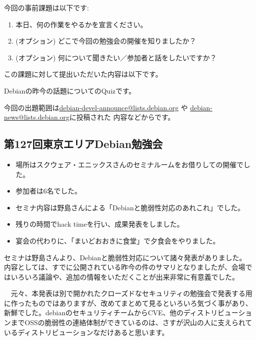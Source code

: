 \documentclass[mingoth,a4paper]{jsarticle}
\begin{document}

今回の事前課題は以下です:
\begin{enumerate}
\item 本日、何の作業をやるかを宣言ください。
\item (オプション) どこで今回の勉強会の開催を知りましたか？
\item (オプション) 何について聞きたい／参加者と話をしたいですか？
\end{enumerate}
この課題に対して提出いただいた内容は以下です。
\begin{multicols}{2}
{\small

}
\end{multicols}


 Debianの昨今の話題についてのQuizです。

今回の出題範囲は\url{debian-devel-announce@lists.debian.org} や \url{debian-news@lists.debian.org}に投稿された
内容などからです。

\begin{multicols}{2}

\end{multicols}


\subsection{第127回東京エリアDebian勉強会}

\begin{itemize}
\item 場所はスクウェア・エニックスさんのセミナルームをお借りしての開催でした。
\item 参加者は6名でした。
\item セミナ内容は野島さんによる「Debianと脆弱性対応のあれこれ」でした。
\item 残りの時間でhack timeを行い、成果発表をしました。
\item 宴会の代わりに、「まいどおおきに食堂」で夕食会をやりました。
\end{itemize} 

  セミナは野島さんより、Debianと脆弱性対応について諸々発表がありました。内容としては、すでに公開されている昨今の件のサマリとなりましたが、会場ではいろいろ議論や、追加の情報をいただくことが出来非常に有意義でした。
  
 　元々、本発表は別で開かれたクローズドなセキュリティの勉強会で発表する用に作ったものではありますが、改めてまとめて見るといろいろ気づく事があり、新鮮でした。debianのセキュリティチームからCVE、他のディストリビューションまでOSSの脆弱性の連絡体制ができているのは、さすが沢山の人に支えられているディストリビューションなだけあると思います。
\end{document}
